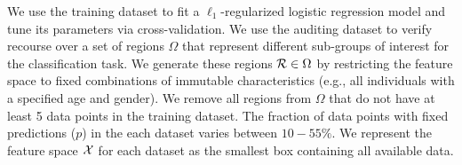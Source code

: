 We use the training dataset to fit a $\ell_1$-regularized logistic regression model and tune its parameters via cross-validation.
%
We use the auditing dataset to verify recourse over a set of regions $\Omega$ that represent different sub-groups of interest for the classification task. We generate these regions ${\cal R} \in \Omega$ by restricting the feature space to fixed combinations of immutable characteristics  (e.g., all individuals with a specified age and gender). 
We remove all regions from $\Omega$ that do not have at least 5 data points in the training dataset. The fraction of data points with fixed predictions ($p$) in the each dataset varies between $10-55\%$. We represent the feature space ${\cal X}$ for each dataset as the smallest box containing all available data.


%
